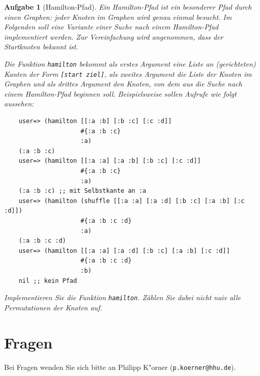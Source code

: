 \documentclass[11pt,a4paper]{article}
\newcounter{numb}
\theoremstyle{break}
\newtheorem{aufgabe}{Aufgabe}[numb]
\begin{document}
\begin{aufgabe}[Hamilton-Pfad]
    Ein Hamilton-Pfad ist ein besonderer Pfad durch einen Graphen:
    jeder Knoten im Graphen wird genau einmal besucht.
    Im Folgenden soll eine Variante einer Suche nach einem Hamilton-Pfad implementiert werden.
    Zur Vereinfachung wird angenommen, dass der Startknoten bekannt ist.

    Die Funktion \verb|hamilton| bekommt als erstes Argument
    eine Liste an (gerichteten) Kanten der Form \verb|[start ziel]|,
    als zweites Argument die Liste der Knoten im Graphen
    und als drittes Argument den Knoten, von dem aus die Suche
    nach einem Hamilton-Pfad beginnen soll.
    Beispielsweise sollen Aufrufe wie folgt aussehen:

    \begin{verbatim}
    user=> (hamilton [[:a :b] [:b :c] [:c :d]]
                     #{:a :b :c} 
                     :a)
    (:a :b :c)
    user=> (hamilton [[:a :a] [:a :b] [:b :c] [:c :d]] 
                     #{:a :b :c}
                     :a) 
    (:a :b :c) ;; mit Selbstkante an :a
    user=> (hamilton (shuffle [[:a :a] [:a :d] [:b :c] [:a :b] [:c :d]])
                     #{:a :b :c :d} 
                     :a)
    (:a :b :c :d)
    user=> (hamilton [[:a :a] [:a :d] [:b :c] [:a :b] [:c :d]]
                     #{:a :b :c :d} 
                     :b)
    nil ;; kein Pfad
    \end{verbatim}

    Implementieren Sie die Funktion \verb|hamilton|.
    Z\"ahlen Sie dabei nicht naiv alle Permutationen der Knoten auf.
\end{aufgabe}

\section*{Fragen}
Bei Fragen wenden Sie sich bitte an Philipp K"orner (\texttt{p.koerner@hhu.de}).
\end{document}
